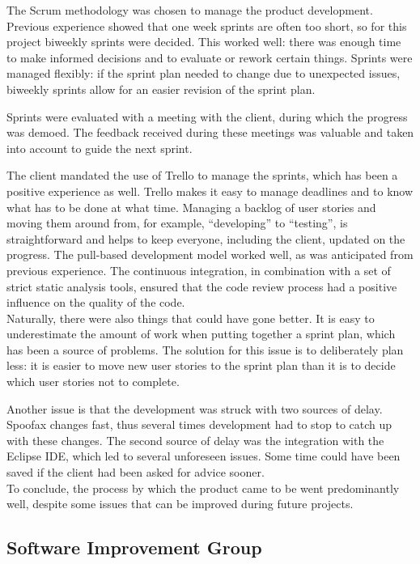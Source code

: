 The Scrum methodology was chosen to manage the product development. Previous
experience showed that one week sprints are often too short, so for this project
biweekly sprints were decided. This worked well: there was enough time to make
informed decisions and to evaluate or rework certain things. Sprints were
managed flexibly: if the sprint plan needed to change due to unexpected issues,
biweekly sprints allow for an easier revision of the sprint plan.

Sprints were evaluated with a meeting with the client, during which the progress
was demoed. The feedback received during these meetings was valuable and taken
into account to guide the next sprint.

The client mandated the use of Trello to manage the sprints, which has been a
positive experience as well. Trello makes it easy to manage deadlines and to
know what has to be done at what time. Managing a backlog of user stories and
moving them around from, for example, ``developing'' to ``testing'', is
straightforward and helps to keep everyone, including the client, updated on the
progress.
The pull-based development model worked well, as was anticipated from previous
experience. The continuous integration, in combination with a set of strict
static analysis tools, ensured that the code review process had a positive
influence on the quality of the code.\\

Naturally, there were also things that could have gone better. It is easy to
underestimate the amount of work when putting together a sprint plan, which has
been a source of problems. The solution for this issue is to deliberately plan
less: it is easier to move new user stories to the sprint plan than it is to decide
which user stories not to complete.

Another issue is that the development was struck with two sources of delay.
Spoofax changes fast, thus several times development had to stop to catch up
with these changes. The second source of delay was the integration with the
Eclipse IDE, which led to several unforeseen issues. Some time could have been
saved if the client had been asked for advice sooner.\\

To conclude, the process by which the product came to be went predominantly
well, despite some issues that can be improved during future projects.

\subsection{Software Improvement Group}
\label{ssec:sig}

